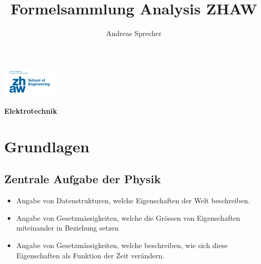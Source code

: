\documentclass[6pt,a4paper]{scrartcl}
\title{Formelsammlung Analysis ZHAW}
\author{Andreas Sprecher}
\renewcommand{\emph}[1]{\textbf{#1}}                                                            %
\begin{document}
\begin{multicols*}{4}
\setlength{\columnseprule}{0.4pt}
    \parbox{3cm}{
        \includegraphics[height=1.5cm]{./img/Logo.jpeg}
    }
    \parbox{4cm}{
        \emph{\Large{Elektrotechnik}}
    }
    \vspace{-2mm} 

    \section{Grundlagen}
		\subsection{Zentrale Aufgabe der Physik}    
    			\begin{itemize}\itemsep0pt				
				\item Angabe von Datenstrukturen, welche Eigenschaften der Welt beschreiben.
				\item Angabe von Gesetzmässigkeiten, welche die Grössen von Eigenschaften miteinander in Beziehung setzen
				\item Angabe von Gesetzmässigkeiten, welche beschreiben, wie sich diese Eigenschaften als Funktion der Zeit verändern.
			\end{itemize}
    

\end{multicols*}
\end{document}
